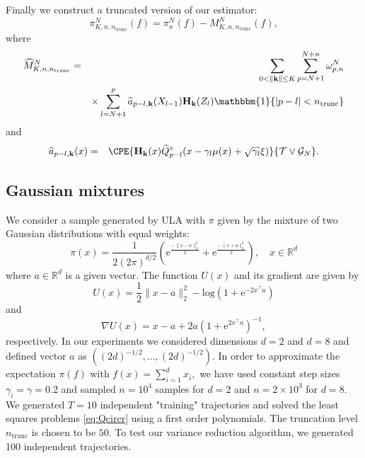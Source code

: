 \documentclass[preprint]{imsart}
\def\rme{\mathrm{e}}
\def\NtrainPath{T}
\def\TrainSet{\mathcal{T}}
\begin{document}
Finally  we construct a truncated version of our estimator:
\[ 
\pi_{K,n,n_{\mathrm{trunc}}}^N(f) = \pi_n^N(f) -  M_{K,n, n_{\mathrm{trunc}}}^{N}(f),
\]
where 
\begin{eqnarray*}
{\widehat  M}_{K,n, n_{\mathrm{trunc}}}^N &=& \sum_{0<\left\| \mathbf{k}\right\| \leq K} \sum_{p=N+1}^{N+n} \omega_{p,n}^N
\\
&&\times
\sum_{l=N+1}^p {\widehat  a}_{p-l,\mathbf{k}}(X_{l-1})\mathbf{H}_{\mathbf{k}}(Z_l) \mathbbm{1}\{ |p-l| < n_{\mathrm{trunc}} \}
\end{eqnarray*}
and
\begin{eqnarray*}
\widehat a_{p-l,\mathbf{k}} (x) &=&\CPE{\mathbf{H}_\mathbf{k}(x) \widehat{Q}^\circ_{p-l}(x - \gamma_l \mu(x) + \sqrt{\gamma_l}\xi)}{\TrainSet \vee \mathcal{G}_N}.
\end{eqnarray*}
\subsection{Gaussian mixtures}
 We consider a sample generated by ULA with $\pi$  given by the mixture of two Gaussian distributions  with equal weights:
\[
\pi (x) = \frac{1}{2(2\pi)^{d/2}} \left( \rme^{\frac{-\| x-a\|_2^2}{2}}  + \rme^{\frac{-\| x+a\|_2^2}{2}} \right), \quad x \in\mathbb R^d
\]
where $a \in \mathbb{R}^d$ is a given vector. The function $U(x)$ and its gradient are given by
\[
U(x) = \frac{1}{2} \|x - a\|_2^2 - \text{log}(1 + \rme^{-2x^\top a})
\]
and
\[
\nabla U(x) = x-a +2a(1 + \rme^{2 x^\top a})^{-1},
\]
respectively.
In our experiments we considered dimensions $d = 2$ and $d = 8$ and defined vector $a$ as $( (2d)^{-1/2}, \dots, (2d)^{-1/2})$. 
In order to approximate the expectation \(\pi(f)\) with \(f(x)=\sum_{i=1}^d x_i,\) 
 we have used constant step sizes $\gamma_i = \gamma=0.2$ and sampled $n = 10^4$ samples for $d = 2$ and $n = 2 \times 10^3$ for $d = 8$.  We generated $\NtrainPath = 10$ independent "training" trajectories and solved the least squares  problems \eqref{eq:Qcircr} using a first order polynomials. The truncation level \(n_{\mathrm{trunc}}\) is chosen to be \(50.\) To test our variance reduction algorithm, we generated 100 independent trajectories. 
 
\end{document}
